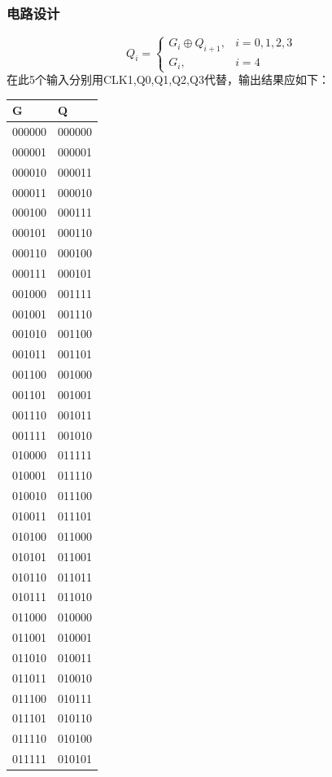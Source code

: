 \documentclass[UTF8, a4paper, 11pt]{article}
\begin{document}
\subsubsection{电路设计}
$$
Q_i=
\begin{cases}
    G_i\oplus Q_{i+1},&i=0,1,2,3\\
    G_i,&i=4
\end{cases}
$$
在此5个输入分别用CLK1,Q0,Q1,Q2,Q3代替，输出结果应如下：
\begin{table}[H]
    \center
\begin{tabular}{|l|l|}
\hline
G      & Q      \\ \hline
000000 & 000000 \\ \hline
000001 & 000001 \\ \hline
000010 & 000011 \\ \hline
000011 & 000010 \\ \hline
000100 & 000111 \\ \hline
000101 & 000110 \\ \hline
000110 & 000100 \\ \hline
000111 & 000101 \\ \hline
001000 & 001111 \\ \hline
001001 & 001110 \\ \hline
001010 & 001100 \\ \hline
001011 & 001101 \\ \hline
001100 & 001000 \\ \hline
001101 & 001001 \\ \hline
001110 & 001011 \\ \hline
001111 & 001010 \\ \hline
010000 & 011111 \\ \hline
010001 & 011110 \\ \hline
010010 & 011100 \\ \hline
010011 & 011101 \\ \hline
010100 & 011000 \\ \hline
010101 & 011001 \\ \hline
010110 & 011011 \\ \hline
010111 & 011010 \\ \hline
011000 & 010000 \\ \hline
011001 & 010001 \\ \hline
011010 & 010011 \\ \hline
011011 & 010010 \\ \hline
011100 & 010111 \\ \hline
011101 & 010110 \\ \hline
011110 & 010100 \\ \hline
011111 & 010101 \\ \hline
\end{tabular}
\end{table}
\end{document}
